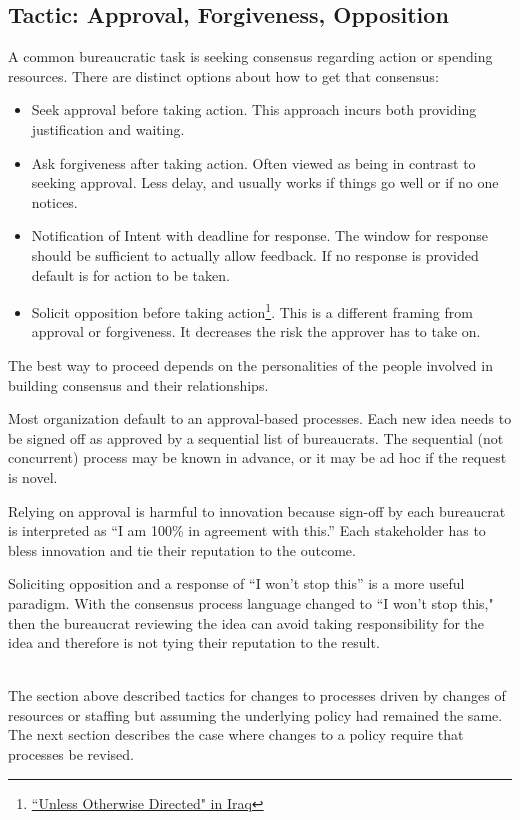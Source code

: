 \subsection*{Tactic: Approval, Forgiveness, Opposition\label{sec:approval-forgiveness-opposition}}

A common bureaucratic task is seeking consensus regarding action or spending resources. There are distinct options about how to get that consensus:
\begin{itemize}
    \item Seek approval before taking action. This approach incurs both providing justification and waiting.
    \item Ask forgiveness after taking action. Often viewed as being in contrast to seeking approval. Less delay, and usually works if things go well or if no one notices. 
    \item Notification of Intent with deadline for response. The window for response should be sufficient to actually allow feedback. If no response is provided default is for action to be taken.
    \item Solicit opposition before taking action\footnote{\href{https://www.dailykos.com/stories/2009/2/11/696188/-}{``Unless Otherwise Directed" in Iraq}}. This is a different framing from approval or forgiveness. It decreases the risk the approver has to take on.
\end{itemize}
The best way to proceed depends on the personalities of the people involved in building consensus and their relationships. 

Most organization default to an approval-based  processes. Each new idea needs to be signed off as approved by a sequential list of \glspl{bureaucrat}. The sequential (not concurrent) process may be known in advance, or it may be ad hoc if the request is novel.

Relying on approval is harmful to innovation because sign-off by each bureaucrat is interpreted as ``I am 100\% in agreement with this.'' Each stakeholder has to bless innovation and tie their reputation to the outcome.

Soliciting opposition and a response of ``I won't stop this'' is a more useful paradigm. With the consensus process language changed to ``I won't stop this," then the bureaucrat reviewing the idea can avoid taking responsibility for the idea and therefore is not tying their reputation to the result.


\ \\

The section above described tactics for changes to processes driven by changes of resources or staffing but assuming the underlying policy had remained the same. The next section describes the case where changes to a policy require that processes be revised. 